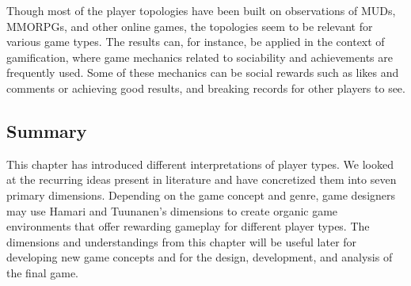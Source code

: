 Though most of the player topologies have been built on observations of MUDs, MMORPGs, and other online games, the topologies seem to be relevant for various game types. The results can, for instance, be applied in the context of gamification, where game mechanics related to sociability and achievements are frequently used. Some of these mechanics can be social rewards such as likes and comments or achieving good results, and breaking records for other players to see.

\subsection{Summary}
This chapter has introduced different interpretations of player types. We looked at the recurring ideas present in literature and have concretized them into seven primary dimensions. Depending on the game concept and genre, game designers may use Hamari and Tuunanen’s dimensions to create organic game environments that offer rewarding gameplay for different player types. The dimensions and understandings from this chapter will be useful later for developing new game concepts and for the design, development, and analysis of the final game.
